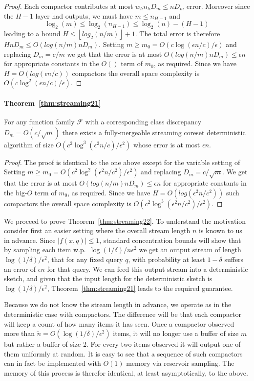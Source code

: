 \documentclass[anon,12pt]{colt2019} %
\newcommand{\eps}{\epsilon}
\newcommand{\F}{\mathcal{F}}
\newcommand{\floor}[1]{\left \lfloor #1 \right \rfloor}
\begin{document}
{\begin{proof}
Each compactor contributes at most $w_h n_h D_m \le n D_m$ error. Moreover since the $H-1$ layer had outputs, we must have $m \leq n_{H-1}$ and
$$  \log_2(m) \leq \log_2(n_{H-1}) \leq \log_2(n) - (H-1)$$
leading to a bound $H \le \floor{log_2(n/m)}+1$.
The total error is therefore $H n D_m \le O(log(n/m) n D_m)$. 
Setting $m \ge m_0 = O(c\log(\eps n/c)/\eps)$ and replacing $D_m = c/m$ we get that the error is at most $O(log(n/m) n D_m) \le \eps n$ for appropriate constants in the $O()$ term of $m_0$, as required. 
Since we have $H = O(log(\eps n/c))$ compactors the overall space complexity is $O(c\log^2(\eps n/c)/\eps)$. 
\end{proof}

\paragraph{Theorem~\ref{thm:streaming21}}
For any function family $\F$ with a corresponding class discrepancy $D_m = O(c/\sqrt{m})$ there exists a fully-mergeable streaming coreset deterministic algorithm of size $O\left(c^2\log^3(\eps^2 n/c) /\eps^2\right)$ whose error is at most $\eps n$. 
\begin{proof}
The proof is identical to the one above except for the variable setting of
Setting $m \ge m_0 = O(c^2\log^2(\eps^2 n/c^2)/\eps^2)$ and replacing $D_m = c/\sqrt{m}$. 
We get that the error is at most $O(log(n/m) n D_m) \le \eps n$ for appropriate constants in the big-$O$ term of $m_0$, as required. 
Since we have $H = O(log(\eps^2 n/c^2))$ such compactors the overall space complexity is $O\left(c^2\log^3(\eps^2 n/c^2) /\eps^2\right)$. 
\end{proof}

We proceed to prove Theorem~\ref{thm:streaming22}. To understand the motivation consider first an easier setting where the overall stream length $n$ is known to us in advance. Since $|f(x,q)| \leq 1$, standard concentration bounds will show that by sampling each item w.p.\ $\log(1/\delta)/n\eps^2$ we get an output stream of length $\log(1/\delta)/\eps^2$, that for any fixed query $q$, with probability at least $1-\delta$ suffers an error of $\eps n$ for that query. We can feed this output stream into a deterministic sketch, and given that the input length for the deterministic sketch is $\log(1/\delta)/\eps^2$, Theorem~\ref{thm:streaming21} leads to the required guarantee.

Because we do not know the stream length in advance, we operate as in the deterministic case with compactors. The difference will be that each compactor will keep a count of how many items it has seen. Once a compactor observed more than $\tilde{n} = O(\log(1/\delta)/\eps^2)$ items, it will no longer use a buffer of size $m$ but rather a buffer of size 2. For every two items observed it will output one of them uniformly at random. It is easy to see that a sequence of such compactors can in fact be implemented with $O(1)$ memory via reservoir sampling. The memory of this process is therefor identical, at least asymptotically, to the above.

}
\end{document}
